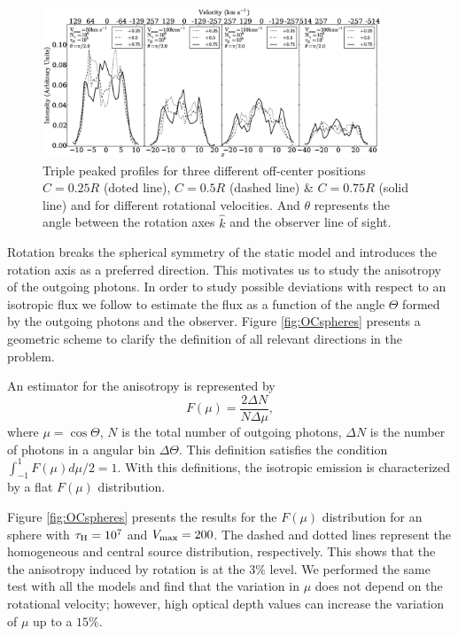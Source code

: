 \documentclass{emulateapj}
\newcommand{\kms}{{\ifmmode{{\mathrm{\,km\ s}^{-1}}}\else{\,km~s$^{-1}$}\fi}}
\begin{document}
\begin{figure}
\begin{center}
\includegraphics[width=0.90\textwidth]{f11.eps}
\end{center}
\caption{Triple peaked profiles for three different off-center positions
  $C=0.25R$ (doted line), $C=0.5R$ (dashed line) \& $C=0.75R$ (solid
  line) and for different rotational velocities. And $\theta$ represents the angle 
  between the rotation axes $\hat{k}$ and the observer line of sight.
   \label{fig:3p_profiles}} 
\end{figure}


Rotation breaks the spherical symmetry of the static model and
introduces the rotation axis as a preferred direction. This motivates
us to study the anisotropy of the outgoing photons. In order to study
possible deviations with respect to an isotropic flux we follow
\cite{Zheng2013} to estimate the flux as a function of the angle
$\Theta$ formed by the outgoing photons and the observer. Figure
\ref{fig:OCspheres} presents a geometric scheme to clarify the
definition of all relevant directions in the problem.

An estimator for the anisotropy is represented by
%
\begin{equation}
F(\mu) = \frac{2\Delta N}{N\Delta \mu}, 
\end{equation} 
%
where $\mu=\cos\Theta$, $N$ is the total number of outgoing photons,
$\Delta N$ is the number of photons in a angular bin $\Delta
\Theta$. This definition satisfies the condition
$\int_{-1}^{1}F(\mu)d\mu/2=1$.  With this definitions, the isotropic
emission is characterized by a flat $F(\mu)$ distribution. 


Figure \ref{fig:OCspheres} presents the results for the $F(\mu)$
distribution for an sphere with $\tau_{\rm H}=10^{7}$ and $V_{\rm
  max}=200$\kms. The dashed and dotted lines represent the homogeneous
and central source distribution, respectively. This shows that the
the  anisotropy induced by rotation is at the $3\%$ level. We
performed the same test with all the models and find that the
variation in $\mu$ does not depend on the rotational velocity;
however, high optical depth values can increase the variation of
$\mu$ up to a $15\%$. 
\end{document}
